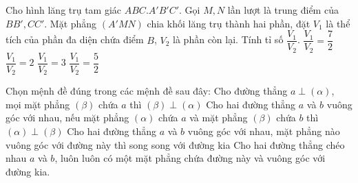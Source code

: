 \begin{ex}%
Cho hình lăng trụ tam giác $ABC.A'B'C'$. Gọi $M,N$ lần lượt là trung điểm của $BB',CC'$. Mặt phẳng $(A'MN)$ chia khối lăng trụ thành hai phần, đặt $V_1$ là thể tích của phần đa diện chứa điểm $B$, $V_2$ là phần còn lại. Tính tỉ số $\dfrac{V_1}{V_2}$.
\choice
{$\dfrac{V_1}{V_2}=\dfrac{7}{2}$}
{\True $\dfrac{V_1}{V_2}=2$}
{$\dfrac{V_1}{V_2}=3 $}
{$\dfrac{V_1}{V_2}=\dfrac{5}{2}$}
\end{ex}
\begin{ex}%
Chọn mệnh đề đúng trong các mệnh đề sau đây:
\choice
{\True Cho đường thẳng $a \perp \left( \alpha \right)$, mọi mặt phẳng $\left( \beta \right)$ chứa $a$ thì $(\beta ) \perp (\alpha )$}
{Cho hai đường thẳng $a$ và $b$ vuông góc với nhau, nếu mặt phẳng $(\alpha )$ chứa $a$ và mặt phẳng $(\beta )$ chứa $b$ thì $(\alpha ) \perp (\beta )$}
{Cho hai đường thẳng $a$ và $b$ vuông góc với nhau, mặt phẳng nào vuông góc với đường này thì song song với đường kia}
{Cho hai đường thẳng chéo nhau $a$ và $b$, luôn luôn có một mặt phẳng chứa đường này và vuông góc với đường kia.}
\end{ex}
